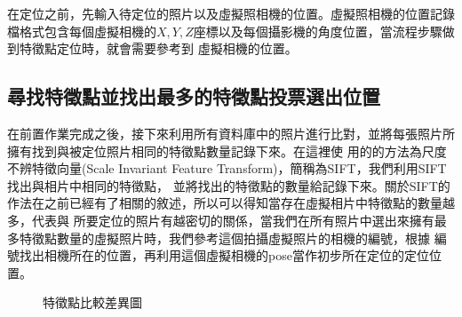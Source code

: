 	在定位之前，先輸入待定位的照片以及虛擬照相機的位置。虛擬照相機的位置記錄檔格式包含每個虛擬相機的$X,Y,Z$座標以及每個攝影機的角度位置，當流程步驟做到特徵點定位時，就會需要參考到
	虛擬相機的位置。
		
\subsection{尋找特徵點並找出最多的特徵點投票選出位置}	

	在前置作業完成之後，接下來利用所有資料庫中的照片進行比對，並將每張照片所擁有找到與被定位照片相同的特徵點數量記錄下來。在這裡使
	用的的方法為尺度不辨特徵向量(Scale Invariant Feature Transform)，簡稱為SIFT，我們利用SIFT找出與相片中相同的特徵點，
	並將找出的特徵點的數量給記錄下來。關於SIFT的作法在之前已經有了相關的敘述，所以可以得知當存在虛擬相片中特徵點的數量越多，代表與
	所要定位的照片有越密切的關係，當我們在所有照片中選出來擁有最多特徵點數量的虛擬照片時，我們參考這個拍攝虛擬照片的相機的編號，根據
	編號找出相機所在的位置，再利用這個虛擬相機的pose當作初步所在定位的定位位置。
	
	\begin{figure}
    	\begin{center}
    	\end{center}
    	\caption{特徵點比較差異圖 }
    	\label{fig:SIFT_Descriptor}
    \end{figure}
	
